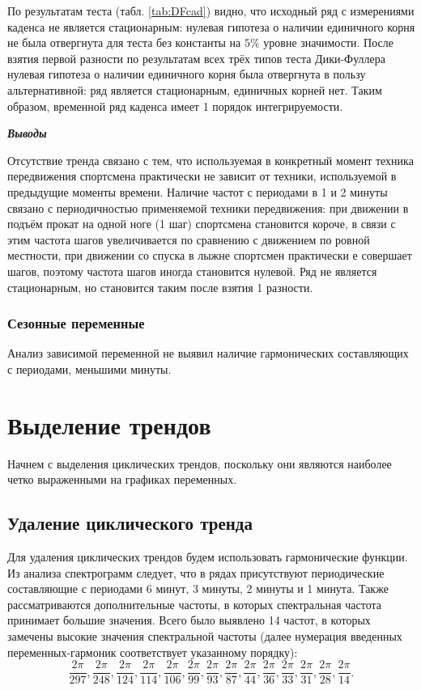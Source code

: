 \documentclass[a4paper,12pt]{article}
\begin{document}
По результатам теста (табл. \ref{tab:DFcad}) видно, что исходный ряд с измерениями каденса не является стационарным: нулевая гипотеза о наличии единичного корня не была отвергнута для теста без константы на $5\%$ уровне значимости. После взятия первой разности по результатам всех трёх типов теста Дики-Фуллера нулевая гипотеза о наличии единичного корня была отвергнута в пользу альтернативной: ряд является стационарным, единичных корней нет. Таким образом, временной ряд каденса имеет 1 порядок интегрируемости. 


\textbf{\textit{Выводы}}

Отсутствие тренда связано с тем, что используемая в конкретный момент техника передвижения спортсмена практически не зависит от техники, используемой в предыдущие моменты времени.
Наличие частот с периодами в 1 и 2 минуты связано с периодичностью применяемой техники передвижения: при движении в подъём прокат на одной ноге (1 шаг) спортсмена становится короче, в связи с этим частота шагов увеличивается по сравнению с движением по ровной местности, при движении со спуска в лыжне спортсмен практически е совершает шагов, поэтому частота шагов иногда становится нулевой. Ряд не является стационарным, но становится таким после взятия 1 разности. %

\subsubsection{Сезонные переменные}
Анализ зависимой переменной не выявил наличие гармонических составляющих с периодами, меньшими минуты.

\section{Выделение трендов}
Начнем с выделения циклических трендов, поскольку они являются наиболее четко выраженными на графиках переменных.

\subsection{Удаление циклического тренда}
Для удаления циклических трендов будем использовать гармонические функции. Из анализа спектрограмм следует, что в рядах присутствуют периодические составляющие с периодами 6 минут, 3 минуты, 2 минуты и 1 минута. Также рассматриваются дополнительные частоты, в которых спектральная частота принимает большие значения. Всего было выявлено 14 частот, в которых замечены высокие значения спектральной частоты (далее нумерация введенных переменных-гармоник соответствует указанному порядку): $$\frac{2 \pi}{297}, \frac{2 \pi}{248}, \frac{2 \pi}{124}, \frac{2 \pi}{114}, \frac{2 \pi}{106}, \frac{2 \pi}{99}, \frac{2 \pi}{93}, \frac{2 \pi}{87}, \frac{2 \pi}{44}, \frac{2 \pi}{36}, \frac{2 \pi}{33}, \frac{2 \pi}{31}, \frac{2 \pi}{28}, \frac{2 \pi}{14}.$$
\end{document}
